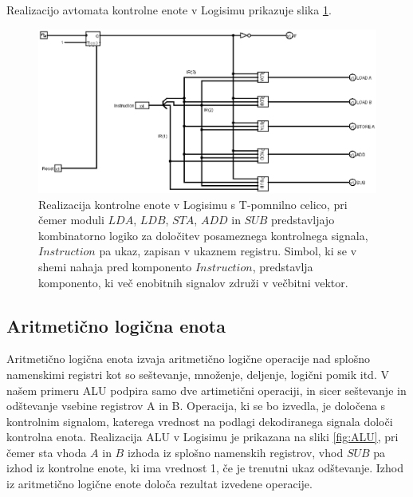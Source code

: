 Realizacijo avtomata kontrolne enote v Logisimu prikazuje slika \ref{fig:CU_logisim}.

\begin{figure}
\begin{center}
\includegraphics[width=0.75\columnwidth]{procesor/img/CU}%
\caption{Realizacija kontrolne enote v Logisimu s T-pomnilno celico, pri čemer moduli $LDA$, $LDB$, $STA$, $ADD$ in $SUB$ predstavljajo kombinatorno logiko za določitev posameznega kontrolnega signala, $Instruction$ pa ukaz, zapisan v ukaznem registru. Simbol, ki se v shemi nahaja pred komponento $Instruction$, predstavlja komponento, ki več enobitnih signalov združi v večbitni vektor.}%
\label{fig:CU_logisim}%
\end{center}
\end{figure}



\subsection{Aritmetično logična enota}
Aritmetično logična enota  izvaja aritmetično logične operacije nad splošno namenskimi registri kot so seštevanje, množenje, deljenje, logični pomik itd. V našem primeru ALU podpira samo dve artimetični operaciji, in sicer seštevanje in odštevanje vsebine registrov A in B. Operacija, ki se bo izvedla, je določena s kontrolnim signalom, katerega vrednost na podlagi dekodiranega signala določi kontrolna enota. Realizacija ALU v Logisimu je prikazana na sliki \ref{fig:ALU}, pri čemer sta vhoda $A$ in $B$ izhoda iz splošno namenskih registrov, vhod $SUB$ pa izhod iz kontrolne enote, ki ima vrednost 1, če je trenutni ukaz odštevanje. Izhod iz aritmetično logične enote določa rezultat izvedene operacije.

